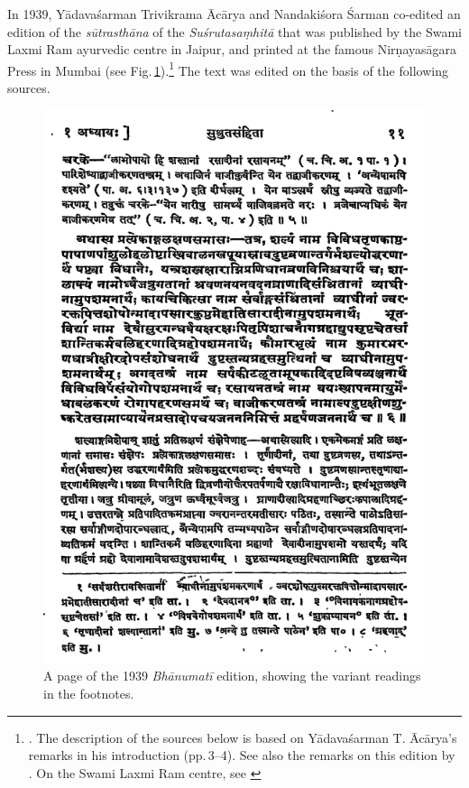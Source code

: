 In 1939, Yādavaśarman Trivikrama Ācārya and Nandakiśora Śarman co-edited an
edition of the \emph{sūtrasthāna} of the \emph{Suśrutasaṃhitā} that was 
published
by the Swami Laxmi Ram ayurvedic centre in Jaipur, and printed at the famous
Nirṇayasāgara Press in Mumbai (see 
Fig.\,\ref{bhanumati}).\footnote{\cite{acar-1939}.  The description of 
the sources 
below is based on Yādavaśarman T. Ācārya's  remarks in his introduction 
(pp.\,3--4). See also the remarks on this edition by
\citet[7]{kleb-2021a}.  On the Swami Laxmi Ram
centre, see \cite{hofe-2007}} The text was edited on the basis of the following 
sources.

\begin{figure}[p]
    \centering
    \includegraphics[draft=false,height=.9\textheight]{media/Bhanumati-page-11}
    \caption{A page of the 1939 \emph{Bhānumatī} edition, showing the variant 
        readings in the footnotes.}
    \label{bhanumati}
\end{figure}



